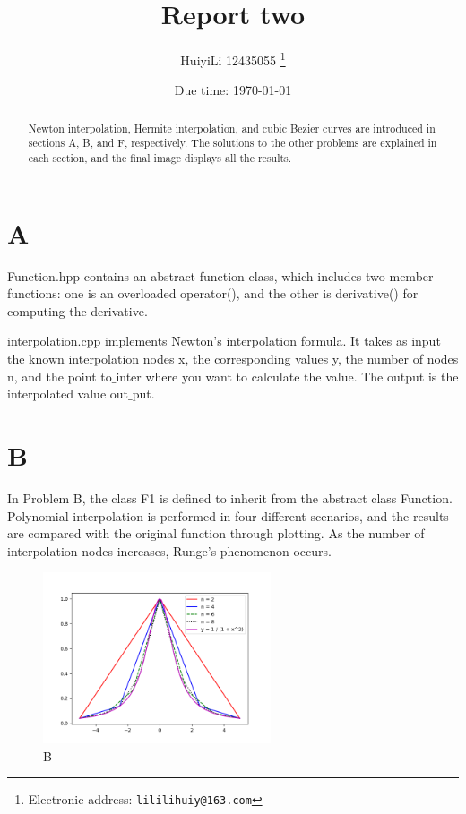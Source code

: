 \documentclass[a4paper]{article}
\begin{document}
\title{Report two}

\author{HuiyiLi 12435055
  \thanks{Electronic address: \texttt{lililihuiy@163.com}}}


\date{Due time: \today}

\maketitle
 \begin{abstract}
  Newton interpolation, Hermite interpolation, and cubic Bezier curves are introduced in sections A, B, and F, respectively. The solutions to the other problems are explained in each section, and the final image displays all the results.
\end{abstract} 


\section{A}
Function.hpp contains an abstract function class, which includes two member functions: one is an overloaded  operator(), and the other is derivative() for computing the derivative.

interpolation.cpp implements Newton's interpolation formula. It takes as input the known interpolation nodes x, the corresponding values y, the number of nodes n,
and the point to$\_$inter where you want to calculate the value. The output is the interpolated value out$\_$put.

\section{B}
In Problem B, the class F1 is defined to inherit from the abstract class Function. Polynomial interpolation is performed in four different scenarios, 
and the results are compared with the original function through plotting. As the number of interpolation nodes increases, Runge's phenomenon occurs.
\begin{figure}[htbp]
  \centering
  \includegraphics[width=0.6\textwidth]{B.png}
  \caption{B}
  \label{B}
\end{figure}
\end{document}
